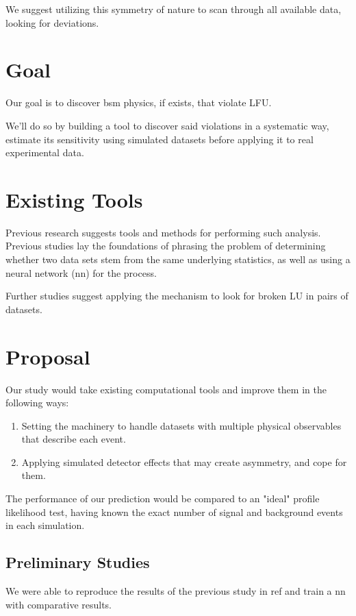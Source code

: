 \documentclass{article}
\begin{document}
We suggest utilizing this symmetry of nature to scan through all available data, looking for deviations.

\section{Goal}
Our goal is to discover \gls{bsm} physics, if exists, that violate LFU.

We'll do so by building a tool to discover said violations in a systematic way, estimate its sensitivity using simulated datasets before applying it to real experimental data.

\section{Existing Tools}
Previous research suggests tools and methods for performing such analysis. Previous studies\cite{Italian no 1 - Learning New Physics from a Machine}\cite{Italian no 2 - Learning New Physics from an Imperfect Machine} lay the foundations of phrasing the problem of determining whether two data sets stem from the same underlying statistics, as well as using a neural network (\gls{nn}) for the process.

Further studies\cite{LastDDPpaper} suggest applying the mechanism to look for broken LU in pairs of datasets.


\section{Proposal}
Our study would take existing computational tools and improve them in the following ways:

\begin{enumerate}
    \item Setting the machinery to handle datasets with multiple physical observables that describe each event.
    \item Applying simulated detector effects that may create asymmetry, and cope for them.
\end{enumerate}

The performance of our prediction would be compared to an "ideal" profile likelihood test\cite{Cowan and Eilam PL formulation}, having known the exact number of signal and background events in each simulation.


\subsection{Preliminary Studies}
We were able to reproduce the results of the previous study in ref \cite{LastDDPpaper} and train a \gls{nn} with comparative results.
\end{document}
